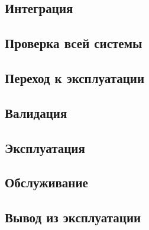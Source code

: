 \documentclass[bibliography=totocnumbered]{scrartcl}
\begin{document}
\subsection{Интеграция}
\subsection{Проверка всей системы}
\subsection{Переход к эксплуатации}
\subsection{Валидация}
\subsection{Эксплуатация}
\subsection{Обслуживание}
\subsection{Вывод из эксплуатации}
\end{document}
